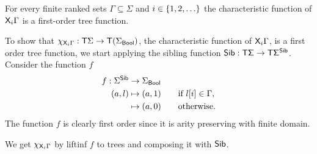     \begin{lemma}\label{lem:nextmod}
        For every finite ranked sets $\Gamma \subseteq \Sigma$ and $i \in \{1,2,\ldots\}$ the characteristic function of $\mathsf X_i \Gamma$ is a first-order tree function.
    \end{lemma}
\begin{pr}
    To show that $\chi_{\mathsf X_i \Gamma}:\mathsf T \Sigma\to \mathsf T{(\Sigma_{\sf{Bool}})}$,  the characteristic function of $\mathsf X_i \Gamma$, is a first order tree function, we start applying the sibling function $\sf{Sib}:\mathsf T\Sigma\to \mathsf T \Sigma^{\sf{Sib}}$. Consider the function $f$
    \begin{align*}
    f:\Sigma^{\sf{Sib}} &\to \Sigma_{\sf{Bool}}\\
    (a,l)& \mapsto (a,1) \qquad\text{if } l[i]\in\Gamma, \\
    & \mapsto (a,0) \qquad\text{otherwise.}   \end{align*}
The function $f$ is clearly first order since it is arity preserving with finite domain.    
    
  We get $\chi_{\mathsf X_i \Gamma}$ by liftinf $f$ to trees and composing it with $\sf{Sib}$. 
\end{pr}

